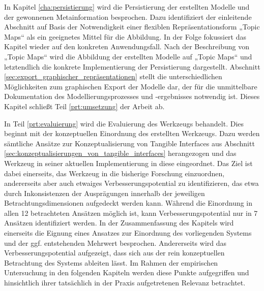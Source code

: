 In Kapitel \ref{cha:persistierung} wird die Persistierung der erstellten Modelle und der gewonnenen Metainformation besprochen. Dazu identifiziert der einleitende Abschnitt auf Basis der Notwendigkeit einer flexiblen Repräsentationsform „Topic Maps“ als ein geeignetes Mittel für die Abbildung. In der Folge fokussiert das Kapitel wieder auf den konkreten Anwendungsfall. Nach der Beschreibung von „Topic Maps“ wird die Abbildung der erstellten Modelle auf „Topic Maps“ und letztendlich die konkrete Implementierung der Persistierung dargestellt.  Abschnitt \ref{sec:export_graphischer_repräsentationen} stellt die unterschiedlichen Möglichkeiten zum graphischen Export der Modelle dar, der für die unmittelbare Dokumentation des Modellierungsprozesses und -ergebnisses notwendig ist. Dieses Kapitel schließt Teil \ref{prt:umsetzung} der Arbeit ab.

In Teil \ref{prt:evaluierung} wird die Evaluierung des Werkzeugs behandelt. Dies beginnt mit der konzeptuellen Einordnung des erstellten Werkzeugs. Dazu werden sämtliche Ansätze zur Konzeptualisierung von Tangible Interfaces aus Abschnitt \ref{sec:konzeptualisierungen_von_tangible_interfaces} herangezogen und das Werkzeug in seiner aktuellen Implementierung in diese eingeordnet. Das Ziel ist dabei einerseits, das Werkzeug in die bisherige Forschung einzuordnen, andererseits aber auch etwaiges Verbesserungspotential zu identifizieren, das etwa durch Inkonsistenzen der Ausprägungen innerhalb der jeweiligen Betrachtungsdimensionen aufgedeckt werden kann. Während die Einordnung in allen 12 betrachteten Ansätzen möglich ist, kann Verbesserungspotential nur in 7 Ansätzen identifiziert werden. In der Zusammenfassung des Kapitels wird einerseits die Eignung eines Ansatzes zur Einordnung des vorliegenden Systems und der ggf. entstehenden Mehrwert besprochen. Andererseits wird das Verbesserungspotential aufgezeigt, dass sich aus der rein konzeptuellen Betrachtung des Systems ableiten lässt. Im Rahmen der empirischen Untersuchung in den folgenden Kapiteln werden diese Punkte aufgegriffen und hinsichtlich ihrer tatsächlich in der Praxis aufgetretenen Relevanz betrachtet.


